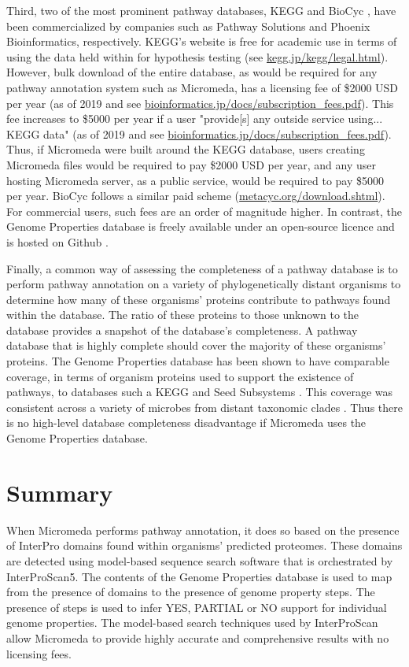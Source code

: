 Third, two of the most prominent pathway databases, KEGG and BioCyc \cite{karp2005expansion}, have been commercialized by companies such as Pathway Solutions and Phoenix Bioinformatics, respectively. KEGG's website is free for academic use in terms of using the data held within for hypothesis testing (see \href{www.kegg.jp/kegg/legal.html}{kegg.jp/kegg/legal.html}). However, bulk download of the entire database, as would be required for any pathway annotation system such as Micromeda, has a licensing fee of \$2000 USD per year (as of 2019 and see \href{bioinformatics.jp/docs/subscription\_fees.pdf}{bioinformatics.jp/docs/subscription\_fees.pdf}). This fee increases to \$5000 per year if a user "provide[s] any outside service using... KEGG data" (as of 2019 and see \href{bioinformatics.jp/docs/subscription\_fees.pdf}{bioinformatics.jp/docs/subscription\_fees.pdf}). Thus, if Micromeda were built around the KEGG database, users creating Micromeda files would be required to pay \$2000 USD per year, and any user hosting Micromeda server, as a public service, would be required to pay \$5000 per year. BioCyc follows a similar paid scheme (\href{metacyc.org/download.shtml}{metacyc.org/download.shtml}). For commercial users, such fees are an order of magnitude higher. In contrast, the Genome Properties database is freely available under an open-source licence and is hosted on Github \cite{richardson2018genome}.

Finally, a common way of assessing the completeness of a pathway database is to perform pathway annotation on a variety of phylogenetically distant organisms to determine how many of these organisms' proteins contribute to pathways found within the database. The ratio of these proteins to those unknown to the database provides a snapshot of the database's completeness. A pathway database that is highly complete should cover the majority of these organisms' proteins. The Genome Properties database has been shown to have comparable coverage, in terms of organism proteins used to support the existence of pathways, to databases such a KEGG and Seed Subsystems \cite{richardson2018genome}. This coverage was consistent across a variety of microbes from distant taxonomic clades \cite{richardson2018genome}. Thus there is no high-level database completeness disadvantage if Micromeda uses the Genome Properties database. 

\section{Summary}

When Micromeda performs pathway annotation, it does so based on the presence of InterPro domains found within organisms' predicted proteomes. These domains are detected using model-based sequence search software that is orchestrated by InterProScan5. The contents of the Genome Properties database is used to map from the presence of domains to the presence of genome property steps. The presence of steps is used to infer YES, PARTIAL or NO support for individual genome properties. The model-based search techniques used by InterProScan allow Micromeda to provide highly accurate and comprehensive results with no licensing fees.
